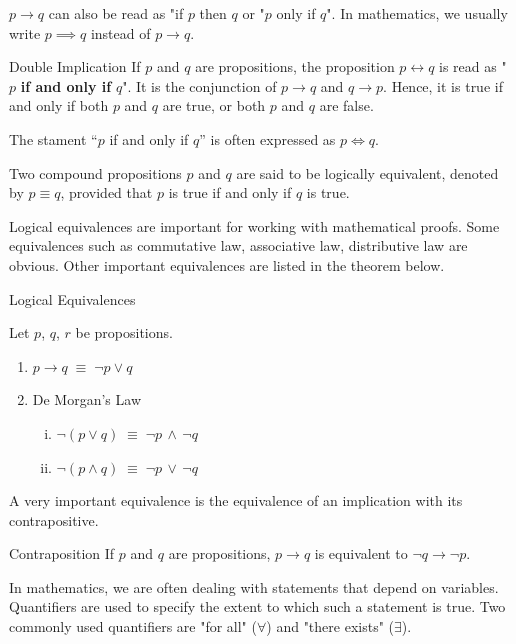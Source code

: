 $p\to q$ can also be read as "if $p$ then $q$ or "$p$ only if $q$". In mathematics, we usually write $p\implies q$ instead of $p\to q$. 

\begin{definition}{Double Implication}
 If $p$ and $q$ are propositions, the proposition $p\longleftrightarrow q$ is read as "$p$ {\bf if and only if} $q$". It is the conjunction of $p\to q$ and $q\to p$. Hence, it is true if and only if both $p$ and $q$ are true, or both $p$ and $q$ are false.
\end{definition}

The stament ``$p$ if and only if $q$'' is often expressed as $p\iff q$.

Two compound propositions $p$ and $q$ are said to be logically equivalent, denoted by $p\equiv q$, provided that $p$ is true if and only if $q$ is true. 


Logical equivalences are important for working with mathematical proofs. Some equivalences such as commutative law, associative law, distributive law are obvious. Other important equivalences are listed in the theorem below.
\begin{theorem}{Logical Equivalences}

Let $p$, $q$, $r$ be propositions. 
\begin{enumerate}[1.]
\item $p\to q \;\equiv \;\neg p\vee q$
\item De Morgan's Law
\begin{enumerate}[(i)]
\item $\neg(p\vee q)\;\equiv\;\neg p\,\wedge\,\neg q$
\item $\neg(p\wedge q)\;\equiv\;\neg p\,\vee\,\neg q$
\end{enumerate}

\end{enumerate}
\end{theorem}

A very important equivalence is the equivalence of an implication with its contrapositive.
\begin{theorem}{Contraposition}
If $p$ and $q$ are propositions, $p\to q$ is equivalent to $\neg q\to\neg p$.
\end{theorem}

In mathematics, we are often dealing with statements that depend on variables. Quantifiers are used to specify the extent to which such a statement is true. Two commonly used quantifiers are "for all" ($\forall$) and "there exists" ($\exists$). 

